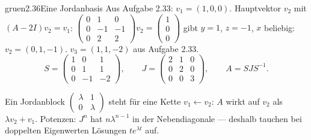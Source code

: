 \begin{loesungkarte}{gruen}{2.36}{Eine Jordanbasis}
Aus Aufgabe 2.33: $v_1 = (1, 0, 0)$. Hauptvektor $v_2$ mit $(A - 2I)v_2 = v_1$: $\begin{pmatrix}0 & 1 & 0\\ 0 & -1 & -1\\ 0 & 2 & 2\end{pmatrix}v_2 = \begin{pmatrix}1\\ 0\\ 0\end{pmatrix}$ gibt $y = 1$, $z = -1$, $x$ beliebig: $v_2 = (0, 1, -1)$.
$v_3 = (1, 1, -2)$ aus Aufgabe 2.33.
\[ S = \begin{pmatrix}1 & 0 & 1\\ 0 & 1 & 1\\ 0 & -1 & -2\end{pmatrix},\qquad J = \begin{pmatrix}2 & 1 & 0\\ 0 & 2 & 0\\ 0 & 0 & 3\end{pmatrix},\qquad A = SJS^{-1}. \]
\begin{mitnehmen}\kastentext
Ein Jordanblock $\begin{pmatrix}\lambda & 1\\ 0 & \lambda\end{pmatrix}$ steht für eine Kette $v_1\leftarrow v_2$: $A$ wirkt auf $v_2$ als $\lambda v_2 + v_1$. Potenzen: $J^{n}$ hat $n\lambda^{n-1}$ in der Nebendiagonale --- deshalb tauchen bei doppelten Eigenwerten Lösungen $te^{\lambda t}$ auf.
\end{mitnehmen}
\end{loesungkarte}

